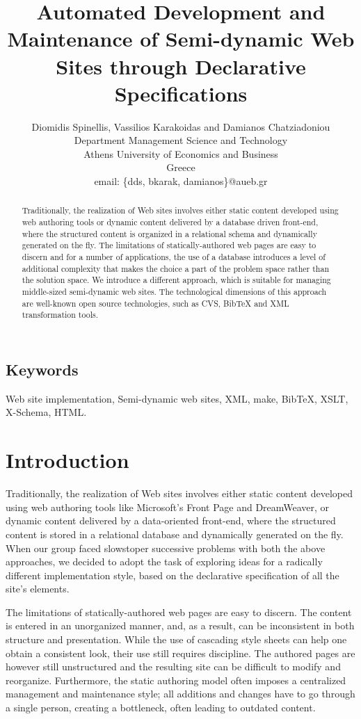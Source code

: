 \documentclass[10pt]{article}
\title{Automated Development and Maintenance of Semi-dynamic Web Sites through Declarative Specifications}
\author{Diomidis Spinellis, Vassilios Karakoidas and Damianos Chatziadoniou\\
Department Management Science and Technology \\
Athens University of Economics and Business \\
Greece\\
email: \{dds, bkarak, damianos\}@aueb.gr}
\date{}
\begin{document}
\maketitle

\begin{abstract}
\noindent
Traditionally, the realization of Web sites involves either
static content developed using web authoring tools or dynamic
content delivered by a database driven front-end,
where the structured content is organized
in a relational schema and dynamically generated on the fly.
The limitations of statically-authored web pages are easy to discern and
for a number of applications, the use of a database
introduces a level of additional complexity that
makes the choice a part of the problem space rather than the solution space.
We introduce a different approach, which is suitable for managing 
middle-sized semi-dynamic web sites. The technological dimensions of this
approach are well-known open source technologies, such as {\sc CVS}, BibTeX 
and {\sc XML} transformation tools.
\end{abstract}

\subsection*{Keywords}
Web site implementation, Semi-dynamic web sites, {\sc XML}, make, BibTeX, {\sc XSLT}, X-Schema, {\sc HTML}.

\section{Introduction}
\label{sec:intro}
Traditionally, the realization of Web sites involves either
static content developed using web authoring tools like
Microsoft's Front Page and DreamWeaver, or dynamic
content delivered by a data-oriented front-end,
where the structured content is stored in a relational database 
and dynamically generated on the fly.
When our group faced slowstoper successive problems with both the above approaches,
we decided to adopt the task of exploring ideas for a radically different
implementation style, based on the declarative specification
of all the site's elements.

The limitations of statically-authored web pages are easy to discern.
The content is entered in an unorganized manner, and, as a result,
can be inconsistent in both structure and presentation.
While the use of cascading style sheets can help one obtain a
consistent look, their use still requires discipline.
The authored pages are however still unstructured and the resulting
site can be difficult to modify and reorganize.
Furthermore, the static authoring model often imposes a centralized
management and maintenance style;
all additions and changes have to go through a single person,
creating a bottleneck, often leading to outdated content.
\end{document}
